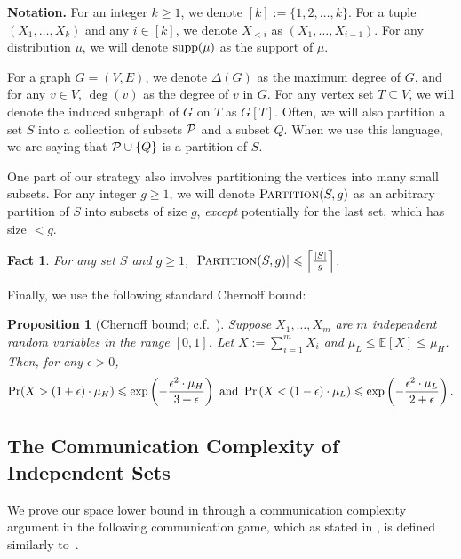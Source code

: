\documentclass[11pt]{article}
\newtheorem{proposition}[lemma]{Proposition}
\newtheorem{fact}[lemma]{Fact}
\theoremstyle{definition}
\renewcommand{\leq}{\leqslant}
\renewcommand{\geq}{\geqslant}
\renewcommand{\le}{\leq}
\renewcommand{\ge}{\geq}
\DeclareMathOperator*{\Prob}{\ensuremath{\textnormal{Pr}}}
\renewcommand{\Pr}{\Prob}
\newcommand{\supp}[1]{\ensuremath{\textnormal{\text{supp}}(#1)}}
\begin{document}
\textbf{Notation. } For an integer $k\ge 1$, we denote $[k]:=\{1,2,\dots,k\}$. For a tuple $(X_1, \dots, X_k)$ and any $i\in [k]$, we denote $X_{<i}$ as $(X_1, \dots, X_{i-1})$. For any distribution $\mu$, we will denote $\supp{\mu}$ as the support of $\mu$. 

For a graph $G=(V, E)$, we denote $\Delta{(G)}$ as the maximum degree of $G$, and for any $v\in V$, $\deg{(v)}$ as the degree of $v$ in $G$. For any vertex set $T\subseteq V$, we will denote the induced subgraph of $G$ on $T$ as $G[T]$. Often, we will also partition a set $S$ into a collection of subsets $\mathcal{P}$ and a subset $Q$. When we use this language, we are saying that $\mathcal{P}\cup \{Q\}$ is a partition of $S$. 

One part of our strategy also involves partitioning the vertices into many small subsets. For any integer $g\ge 1$, we will denote $\textnormal{\textsc{Partition}}(S, g)$ as an arbitrary partition of $S$ into subsets of size $g$, \textit{except} potentially for the last set, which has size $<g$. 
\begin{fact}\label{partition-count}
    For any set $S$ and $g\ge 1$, $|\Partition(S, g)|\le \left\lceil\frac{|S|}g\right\rceil$.
\end{fact}

Finally, we use the following standard Chernoff bound:

\begin{proposition}[Chernoff bound; c.f.~\cite{dubhashi2009concentration}]\label{chernoff}
    Suppose $X_1, \dots, X_m$ are $m$ independent random variables in the range $[0, 1]$. Let $X:=\sum_{i=1}^m X_i$ and $\mu_L\le \mathbb{E}[X]\le \mu_H$. Then, for any $\epsilon > 0$,
    \begin{align*}
        \Pr(X > (1 + \epsilon)\cdot \mu_H)\le\exp\left(-\frac{\epsilon^2\cdot\mu_H}{3+\epsilon}\right)~\mathrm{and}~\Pr\left(X < (1-\epsilon)\cdot \mu_L\right)\le\exp\left(-\frac{\epsilon^2\cdot\mu_L}{2+\epsilon}\right).
    \end{align*}
\end{proposition}

\subsection{The Communication Complexity of Independent Sets}
We prove our space lower bound in  through a communication complexity argument in the following communication game, which as stated in , is defined similarly to~\cite{assadi2022deterministic}.
\end{document}
